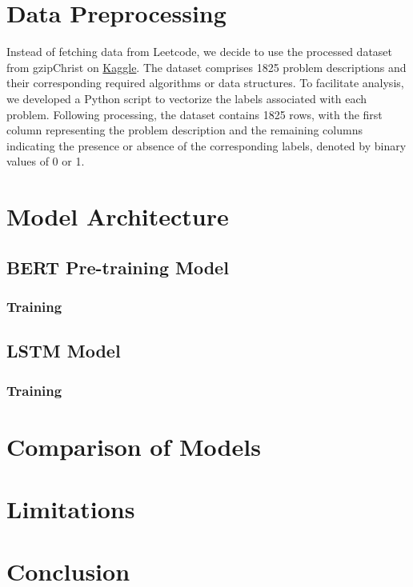 \documentclass{article}
\begin{document}
\section{Data Preprocessing}
Instead of fetching data from Leetcode, we decide to use the processed dataset from gzipChrist\cite{DATA} on \href{https://www.kaggle.com/}{Kaggle}. The dataset comprises 1825 problem descriptions and their corresponding required algorithms or data structures. To facilitate analysis, we developed a Python script to vectorize the labels associated with each problem. Following processing, the dataset contains 1825 rows, with the first column representing the problem description and the remaining columns indicating the presence or absence of the corresponding labels, denoted by binary values of 0 or 1.
\section{Model Architecture}

\subsection{BERT Pre-training Model}

\subsubsection{Training}

\subsection{LSTM Model}

\subsubsection{Training}

\section{Comparison of Models}

\section{Limitations}

\section{Conclusion}
\end{document}
